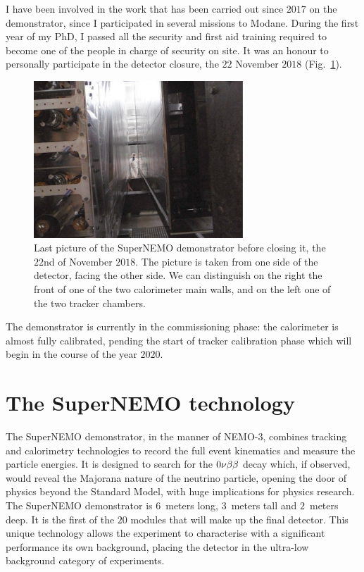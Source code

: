 I have been involved in the work that has been carried out since $2017$ on the demonstrator, since I participated in several missions to Modane.
During the first year of my PhD, I passed all the security and first aid training required to become one of the people in charge of security on site.
It was an honour to personally participate in the detector closure, the $22$ November $2018$ (Fig.~\ref{fig:detector_closing}).
\begin{figure}[h!]
\centering
\includegraphics[width=0.7\textwidth]{SNdemonstrator/fig_SNdemonstrator/detector_closing.pdf}
\caption{Last picture of the SuperNEMO demonstrator before closing it, the $22$nd of November $2018$.
  The picture is taken from one side of the detector, facing the other side.
  We can distinguish on the right the front of one of the two calorimeter main walls, and on the left one of the two tracker chambers.
\label{fig:detector_closing}}
\end{figure}
The demonstrator is currently in the commissioning phase: the calorimeter is almost fully calibrated, pending the start of tracker calibration phase which will begin in the course of the year $2020$.

\section{The SuperNEMO technology}



The SuperNEMO demonstrator, in the manner of NEMO-$3$, combines tracking and calorimetry technologies to record the full event kinematics and measure the particle energies.
It is designed to search for the $0\nu\beta\beta$ decay which, if observed, would reveal the Majorana nature of the neutrino particle, opening the door of physics beyond the Standard Model, with huge implications for physics research.
The SuperNEMO demonstrator is $6$~meters long, $3$~meters tall and $2$~meters deep.
It is the first of the $20$ modules that will make up the final detector.
This unique technology allows the experiment to characterise with a significant performance its own background, placing the detector in the ultra-low background category of experiments.

